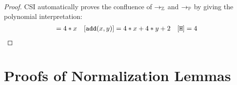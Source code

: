    

    
    
    
    
    



\begin{lemma}
\begin{proof}
CSI automatically proves the confluence of $\rightarrow_\mathbb{Z}$ and $\rightarrow_\mathbb{P}$ by giving the polynomial interpretation:
\begin{align*}
[\tt{succ}(x)] = 4*x & &[\tt{add}(x, y)] = 4 * x + 4 * y + 2  & &[ {\tt{H}} ] = 4 \\
\end{align*}
\end{proof}
\label{lemma:confluenceZP}
\end{lemma}

\section{Proofs of Normalization Lemmas}

